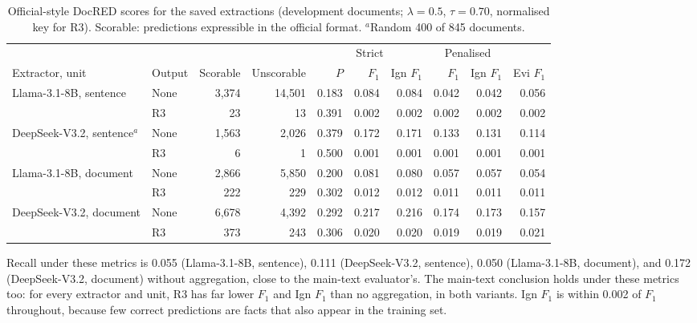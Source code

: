 \documentclass[11pt]{article}
\begin{document}
\begin{table}[htbp]
\centering
\caption{Official-style DocRED scores for the saved extractions
(development documents; $\lambda=0.5$, $\tau=0.70$, normalised key for
R3). Scorable: predictions expressible in the official format.
$^{a}$Random 400 of 845 documents.}
\label{tab:s10-official}
\small
\setlength{\tabcolsep}{3pt}
\begin{adjustbox}{max width=\textwidth}
\begin{tabular}{@{}llrrrrrrrr@{}}
\toprule
 & & & & \multicolumn{3}{c}{Strict} & \multicolumn{2}{c}{Penalised} & \\
\cmidrule(lr){5-7}\cmidrule(lr){8-9}
Extractor, unit & Output & Scorable & Unscorable & $P$ & $F_1$ & Ign $F_1$ & $F_1$ & Ign $F_1$ & Evi $F_1$ \\
\midrule
Llama-3.1-8B, sentence & None & 3,374 & 14,501 & 0.183 & 0.084 & 0.084 & 0.042 & 0.042 & 0.056 \\
 & R3 & 23 & 13 & 0.391 & 0.002 & 0.002 & 0.002 & 0.002 & 0.002 \\
DeepSeek-V3.2, sentence$^{a}$ & None & 1,563 & 2,026 & 0.379 & 0.172 & 0.171 & 0.133 & 0.131 & 0.114 \\
 & R3 & 6 & 1 & 0.500 & 0.001 & 0.001 & 0.001 & 0.001 & 0.001 \\
Llama-3.1-8B, document & None & 2,866 & 5,850 & 0.200 & 0.081 & 0.080 & 0.057 & 0.057 & 0.054 \\
 & R3 & 222 & 229 & 0.302 & 0.012 & 0.012 & 0.011 & 0.011 & 0.011 \\
DeepSeek-V3.2, document & None & 6,678 & 4,392 & 0.292 & 0.217 & 0.216 & 0.174 & 0.173 & 0.157 \\
 & R3 & 373 & 243 & 0.306 & 0.020 & 0.020 & 0.019 & 0.019 & 0.021 \\
\bottomrule
\end{tabular}
\end{adjustbox}
\end{table}

Recall under these metrics is 0.055 (Llama-3.1-8B, sentence), 0.111
(DeepSeek-V3.2, sentence), 0.050 (Llama-3.1-8B, document), and 0.172
(DeepSeek-V3.2, document) without aggregation, close to the main-text
evaluator's. The main-text conclusion holds under these metrics too:
for every extractor and unit, R3 has far lower $F_1$ and Ign $F_1$ than
no aggregation, in both variants. Ign $F_1$ is within 0.002 of $F_1$
throughout, because few correct predictions are facts that also appear
in the training set.
\end{document}
